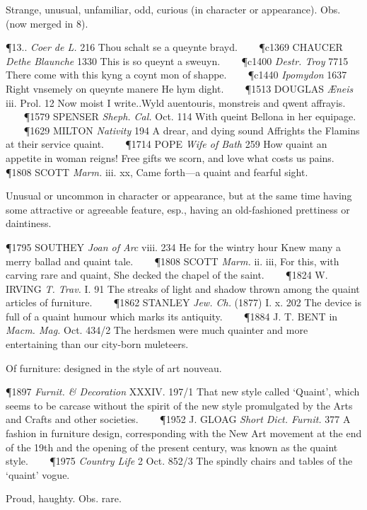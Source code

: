 \begin{description}[wide, labelwidth=!, labelindent=0pt]
\begin{myenumerate}
 Strange, unusual, unfamiliar, odd, curious (in character or appearance). Obs. (now merged in 8).

\P 13.. \textit{Coer  de L.} 216 Thou schalt se a queynte brayd.    
\P c1369 CHAUCER \textit{Dethe Blaunche} 1330 This  is so queynt a sweuyn.    
\P c1400  \textit{Destr. Troy} 7715 There come with this kyng a coynt mon of shappe.    
\P c1440 \textit{Ipomydon} 1637 Right  vnsemely on queynte manere He hym dight.    
\P 1513 DOUGLAS  \textit{Æneis} iii. Prol. 12 Now moist I write..Wyld auentouris, monstreis and qwent affrayis.    
\P 1579 SPENSER  \textit{Sheph. Cal.} Oct. 114 With queint Bellona in her equipage.    
\P 1629 MILTON  \textit{Nativity} 194 A drear, and dying sound Affrights the Flamins at their service quaint.    
\P 1714 POPE  \textit{Wife of Bath} 259 How quaint an appetite in woman reigns! Free gifts we scorn, and love what costs us pains.    
\P 1808 SCOTT  \textit{Marm.} iii. xx, Came forth—a quaint and fearful sight.

 Unusual or uncommon in character or appearance, but at the same time having some attractive or agreeable feature, esp., having an old-fashioned prettiness or daintiness.

\P 1795 SOUTHEY  \textit{Joan of Arc} viii. 234 He for the wintry hour Knew many a merry ballad and quaint tale.    
\P 1808 SCOTT  \textit{Marm.} ii. iii, For this, with carving rare and quaint, She decked the chapel of the saint.    
\P 1824 W. IRVING  \textit{T. Trav.} I. 91 The streaks of light and shadow thrown among the quaint articles of furniture.    
\P 1862 STANLEY  \textit{Jew. Ch.} (1877) I. x. 202 The device is full of a quaint humour which marks its antiquity.    
\P 1884 J. T. BENT in  \textit{Macm. Mag.} Oct. 434/2 The herdsmen were much quainter and more entertaining than our city-born muleteers.

 Of furniture: designed in the style of art nouveau.

\P 1897 \textit{Furnit. \& Decoration}  XXXIV. 197/1 That new style called ‘Quaint’, which seems to be carcase without the spirit of the new style promulgated by the Arts and Crafts and other societies.    
\P 1952 J. GLOAG  \textit{Short Dict. Furnit.} 377 A fashion in furniture design, corresponding with the New Art movement at the end of the 19th and the opening of the present century, was known as the quaint style.    
\P 1975 \textit{Country  Life} 2 Oct. 852/3 The spindly chairs and tables of the ‘quaint’ vogue.

 Proud, haughty. Obs. rare.


\end{myenumerate}
\end{description}
